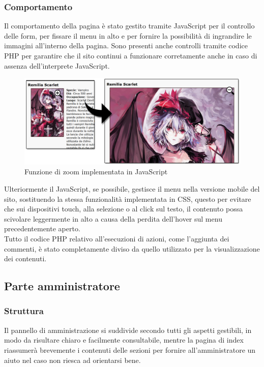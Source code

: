 \documentclass[openany, a4paper, 12pt]{report}
\begin{document}
			\subsubsection{Comportamento}
			Il comportamento della pagina è stato gestito tramite JavaScript per il controllo delle form, per fissare il menu in alto e per fornire la possibilità di ingrandire le immagini all'interno della pagina. Sono presenti anche controlli tramite codice PHP per garantire che il sito continui a funzionare corretamente anche in caso di assenza dell'interprete JavaScript.
			
			\begin{figure}[H]
				\centering
				\includegraphics[width=0.8\linewidth]{images/zomm}
				\caption{Funzione di zoom implementata in JavaScript}
			\end{figure}
			
			Ulteriormente il JavaScript, se possibile, gestisce il menu nella versione mobile del sito, sostituendo la stessa funzionalità implementata in CSS, questo per evitare che sui dispositivi touch, alla selezione o al click sul testo, il contenuto possa scivolare leggermente in alto a causa della perdita dell'hover sul menu precedentemente aperto.\\
			Tutto il codice PHP relativo all'esecuzioni di azioni, come l'aggiunta dei commenti, è stato completamente diviso da quello utilizzato per la visualizzazione dei contenuti.\\

	\subsection{Parte amministratore}
		\subsubsection{Struttura}
		Il pannello di amministrazione si suddivide secondo tutti gli aspetti gestibili, in modo da risultare chiaro e facilmente consultabile, mentre la pagina di index riassumerà brevemente i contenuti delle sezioni per fornire all'amministratore un aiuto nel caso non riesca ad orientarsi bene.
\end{document}
